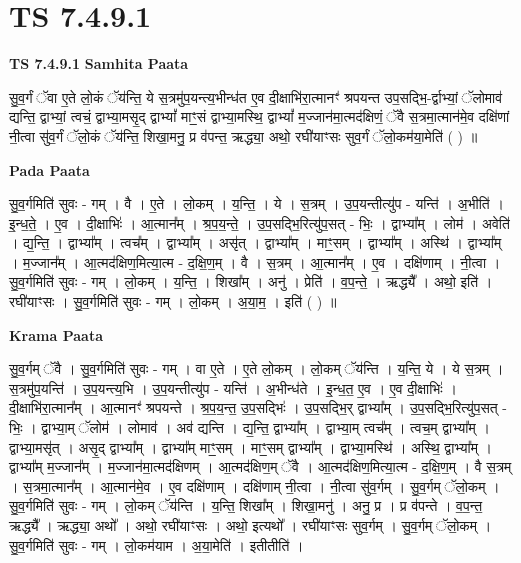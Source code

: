 \documentclass[17pt]{extarticle}
\begin{document}
\section{ TS 7.4.9.1 }

\textbf{TS 7.4.9.1 } \newline
\textbf{Samhita Paata} \newline

सु॒व॒र्गं ॅवा ए॒ते लो॒कं ॅय॑न्ति॒ ये स॒त्रमु॑प॒यन्त्य॒भीन्ध॑त ए॒व दी॒क्षाभि॑रा॒त्मानꣳ॑ श्रपयन्त उप॒सद्भि॒-र्द्वाभ्यां॒ ॅलोमाव॑ द्यन्ति॒ द्वाभ्यां॒ त्वचं॒ द्वाभ्या॒मसृ॒द् द्वाभ्यां᳚ माꣳ॒॒सं द्वाभ्या॒मस्थि॒ द्वाभ्यां᳚ म॒ज्जान॑मा॒त्मद॑क्षिणं॒ ॅवै स॒त्रमा॒त्मान॑मे॒व दक्षि॑णां नी॒त्वा सु॑व॒र्गं ॅलो॒कं ॅय॑न्ति॒ शिखा॒मनु॒ प्र व॑पन्त॒ ऋद्ध्या॒ अथो॒ रघी॑याꣳसः सुव॒र्गं ॅलो॒कम॑या॒मेति॑ ( ) ॥ \newline

\textbf{Pada Paata} \newline

सु॒व॒र्गमिति॑ सुवः - गम् । वै । ए॒ते । लो॒कम् । य॒न्ति॒ । ये । स॒त्रम् । उ॒प॒यन्तीत्यु॑प - यन्ति॑ । अ॒भीति॑ । इ॒न्ध॒ते॒ । ए॒व । दी॒क्षाभिः॑ । आ॒त्मान᳚म् । श्र॒प॒य॒न्ते॒ । उ॒प॒सद्भि॒रित्यु॑प॒सत् - भिः॒ । द्वाभ्या᳚म् । लोम॑ । अवेति॑ । द्य॒न्ति॒ । द्वाभ्या᳚म् । त्वच᳚म् । द्वाभ्या᳚म् । असृ॑त् । द्वाभ्या᳚म् । माꣳ॒॒सम् । द्वाभ्या᳚म् । अस्थि॑ । द्वाभ्या᳚म् । म॒ज्जान᳚म् । आ॒त्मद॑क्षिण॒मित्या॒त्म - द॒क्षि॒ण॒म् । वै । स॒त्रम् । आ॒त्मान᳚म् । ए॒व । दक्षि॑णाम् । नी॒त्वा । सु॒व॒र्गमिति॑ सुवः - गम् । लो॒कम् । य॒न्ति॒ । शिखा᳚म् । अनु॑ । प्रेति॑ । व॒प॒न्ते॒ । ऋद्ध्यै᳚ । अथो॒ इति॑ । रघी॑याꣳसः । सु॒व॒र्गमिति॑ सुवः - गम् । लो॒कम् । अ॒या॒म॒ । इति॑ ( ) ॥  \newline


\textbf{Krama Paata} \newline

सु॒व॒र्गम् ॅवै । सु॒व॒र्गमिति॑ सुवः - गम् । वा ए॒ते । ए॒ते लो॒कम् । लो॒कम् ॅय॑न्ति । य॒न्ति॒ ये । ये स॒त्रम् । स॒त्रमु॑प॒यन्ति॑ । उ॒प॒यन्त्य॒भि । उ॒प॒यन्तीत्यु॑प - यन्ति॑ । अ॒भीन्ध॑ते । इ॒न्ध॒त॒ ए॒व । ए॒व दी॒क्षाभिः॑ । दी॒क्षाभि॑रा॒त्मान᳚म् । आ॒त्मानꣳ॑ श्रपयन्ते । श्र॒प॒य॒न्त॒ उ॒प॒सद्‍भिः॑ । उ॒प॒सद्‍भि॒र् द्वाभ्या᳚म् । उ॒प॒सद्भि॒रित्यु॑प॒सत् - भिः॒ । द्वाभ्या॒म् ॅलोम॑ । लोमाव॑ । अव॑ द्यन्ति । द्य॒न्ति॒ द्वाभ्या᳚म् । द्वाभ्या॒म् त्वच᳚म् । त्वच॒म् द्वाभ्या᳚म् । द्वाभ्या॒मसृ॑त् । असृ॒द् द्वाभ्या᳚म् । द्वाभ्या᳚म् माꣳ॒॒सम् । माꣳ॒॒सम् द्वाभ्या᳚म् । द्वाभ्या॒मस्थि॑ । अस्थि॒ द्वाभ्या᳚म् । द्वाभ्या᳚म् म॒ज्जान᳚म् । म॒ज्जान॑मा॒त्मद॑क्षिणम् । आ॒त्मद॑क्षिण॒म् ॅवै । आ॒त्मद॑क्षिण॒मित्या॒त्म - द॒क्षि॒ण॒म् । वै स॒त्रम् । स॒त्रमा॒त्मान᳚म् । आ॒त्मान॑मे॒व । ए॒व दक्षि॑णाम् । दक्षि॑णाम् नी॒त्वा । नी॒त्वा सु॑व॒र्गम् । सु॒व॒र्गम् ॅलो॒कम् । सु॒व॒र्गमिति॑ सुवः - गम् । लो॒कम् ॅय॑न्ति । य॒न्ति॒ शिखा᳚म् । शिखा॒मनु॑ । अनु॒ प्र । प्र व॑पन्ते । व॒प॒न्त॒ ऋद्ध्यै᳚ । ऋद्ध्या॒ अथो᳚ । अथो॒ रघी॑याꣳसः । अथो॒ इत्यथो᳚ । रघी॑याꣳसः सुव॒र्गम् । सु॒व॒र्गम् ॅलो॒कम् । सु॒व॒र्गमिति॑ सुवः - गम् । लो॒कम॑याम । अ॒या॒मेति॑ । इतीतीति॑ । \newline
\end{document}
